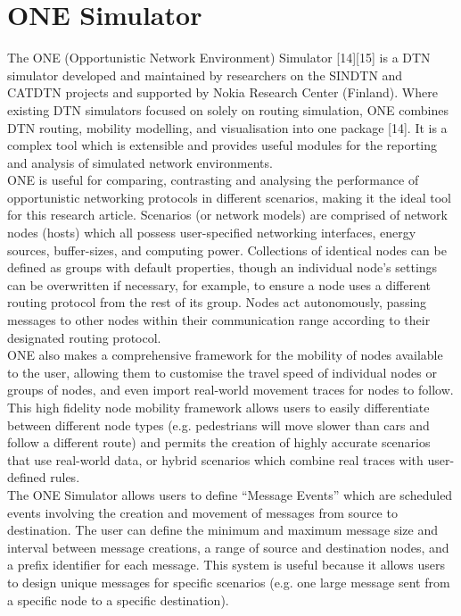\documentclass{article}
\begin{document}
\section{ONE Simulator}
The ONE (Opportunistic Network Environment) Simulator [14][15] is a DTN simulator developed and maintained by researchers on the SINDTN and CATDTN projects and supported by Nokia Research Center (Finland). Where existing DTN simulators focused on solely on routing simulation, ONE combines DTN routing, mobility modelling, and visualisation into one package [14]. It is a complex tool which is extensible and provides useful modules for the reporting and analysis of simulated network environments.\\
\newline ONE is useful for comparing, contrasting and analysing the performance of opportunistic networking protocols in different scenarios, making it the ideal tool for this research article. Scenarios (or network models) are comprised of network nodes (hosts) which all possess user-specified networking interfaces, energy sources, buffer-sizes, and computing power. Collections of identical nodes can be defined as groups with default properties, though an individual node's settings can be overwritten if necessary, for example, to ensure a node uses a different routing protocol from the rest of its group. Nodes act autonomously, passing messages to other nodes within their communication range according to their designated routing protocol.\\ 
\newline ONE also makes a comprehensive framework for the mobility of nodes available to the user, allowing them to customise the travel speed of individual nodes or groups of nodes, and even import real-world movement traces for nodes to follow. This high fidelity node mobility framework allows users to easily differentiate between different node types (e.g. pedestrians will move slower than cars and follow a different route) and permits the creation of highly accurate scenarios that use real-world data, or hybrid scenarios which combine real traces with user-defined rules.\\
\newline The ONE Simulator allows users to define ``Message Events'' which are scheduled events involving the creation and movement of messages from source to destination. The user can define the minimum and maximum message size and interval between message creations, a range of source and destination nodes, and a prefix identifier for each message. This system is useful because it allows users to design unique messages for specific scenarios (e.g. one large message sent from a specific node to a specific destination).\\
\end{document}
